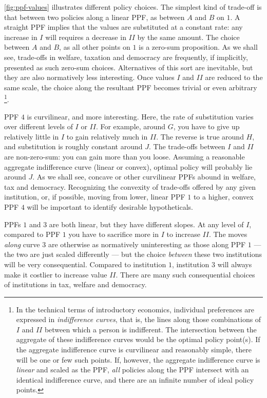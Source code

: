 	\autoref{fig:ppf-values} illustrates different policy choices.
	The simplest kind of trade-off is that between two policies along a linear \gls{PPF}, as between $A$ and $B$ on $1$.
	A straight \gls{PPF} implies that the values are substituted at a constant rate: any increase in $I$ will requires a decrease in $II$ by the same amount.
	The choice between $A$ and $B$, as all other points on $1$ is a zero-sum proposition.
	As we shall see, trade-offs in welfare, taxation and democracy are frequently, if implicitly, presented as such zero-sum choices.
	Alternatives of this sort are inevitable, but they are also normatively less interesting.
	Once values $I$ and $II$ are reduced to the same scale, the choice along the resultant \gls{PPF} becomes trivial or even arbitrary
	\footnote{
		In the technical terms of introductory economics, individual preferences are expressed in \emph{indifference curves}, that is, the lines along those combinations of $I$ and $II$ between which a person is indifferent.
		The intersection between the aggregate of these indifference curves would be the optimal policy point(s). %
		If the aggregate indifference curve is curvilinear and reasonably simple, there will be one or few such points.
		If, however, the aggregate indifference curve is \emph{linear} and scaled as the \gls{PPF}, \emph{all} policies along the \gls{PPF} intersect with an identical indifference curve, and there are an infinite number of ideal policy points.
	}.%
	
	\gls{PPF} $4$ is curvilinear, and more interesting. 
	Here, the rate of substitution varies over different levels of $I$ or $II$.
	For example, around $G$, you have to give up relatively little in $I$ to gain relatively much in $II$. 
	The reverse is true around $H$, and substitution is roughly constant around $J$.
	The trade-offs between $I$ and $II$ are non-zero-sum: you can gain more than you loose.
	Assuming a reasonable aggregate indifference curve (linear or convex), optimal policy will probably lie around $J$.
	As we shall see, concave or other curvilinear \glspl{PPF} abound in welfare, tax and democracy.
	Recognizing the convexity of trade-offs offered by any given institution, or, if possible, moving from lower, linear \gls{PPF} $1$ to a higher, convex \gls{PPF} $4$ will be important to identify desirable hypotheticals.%
	
	\glspl{PPF} $1$ and $3$ are both linear, but they have different slopes. 
	At any level of $I$, compared to \gls{PPF} $1$ you have to sacrifice more in $I$ to increase $II$.
	The moves \emph{along} curve $3$ are otherwise as normatively uninteresting as those along \gls{PPF} $1$ --- the two are just scaled differently --- but the choice \emph{between} these two institutions will be very consequential.
	Compared to institution $1$, institution $3$ will always make it costlier to increase value $II$.
	There are many such consequential choices of institutions in tax, welfare and democracy. %
	
